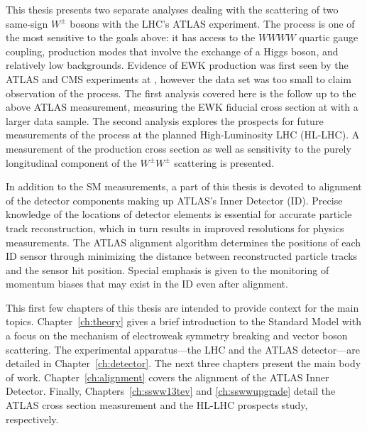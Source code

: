 This thesis presents two separate analyses dealing with the scattering of two same-sign $W^{\pm}$ bosons with the LHC's ATLAS experiment.
The \ssww process is one of the most sensitive to the goals above: it has access to the $WWWW$ quartic gauge coupling, production modes that involve the exchange of a Higgs boson, and relatively low backgrounds.
Evidence of EWK \ssww production was first seen by the ATLAS and CMS experiments at , however the data set was too small to claim observation of the process.
The first analysis covered here is the follow up to the above ATLAS measurement, measuring the EWK fiducial cross section at  with a larger data sample.
The second analysis explores the prospects for future measurements of the \ssww process at the planned High-Luminosity LHC (HL-LHC).
A measurement of the production cross section as well as sensitivity to the purely longitudinal component of the $W^{\pm}W^{\pm}$ scattering is presented.

In addition to the SM measurements, a part of this thesis is devoted to alignment of the detector components making up ATLAS's Inner Detector (ID).
Precise knowledge of the locations of detector elements is essential for accurate particle track reconstruction, which in turn results in improved resolutions for physics measurements.
The ATLAS alignment algorithm determines the positions of each ID sensor through minimizing the distance between reconstructed particle tracks and the sensor hit position.
Special emphasis is given to the monitoring of momentum biases that may exist in the ID even after alignment.

This first few chapters of this thesis are intended to provide context for the main topics.
Chapter~\ref{ch:theory} gives a brief introduction to the Standard Model with a focus on the mechanism of electroweak symmetry breaking and vector boson scattering.
The experimental apparatus---the LHC and the ATLAS detector---are detailed in Chapter~\ref{ch:detector}.
The next three chapters present the main body of work.
Chapter~\ref{ch:alignment} covers the alignment of the ATLAS Inner Detector.
Finally, Chapters~\ref{ch:ssww13tev} and \ref{ch:sswwupgrade} detail the ATLAS  \ssww cross section measurement and the  HL-LHC \ssww prospects study, respectively.

